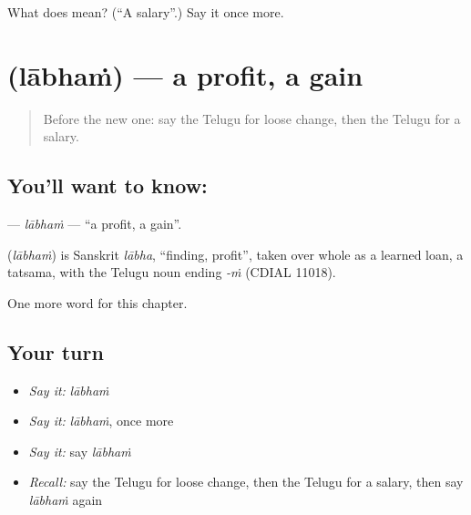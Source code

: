 \begin{tcolorbox}[breakable,colback=teal!4,colframe=teal!35!black,title={Before you move on}]
What does  mean? (\textquotedblleft{}A salary\textquotedblright{}.) Say it once more.
\end{tcolorbox}
\section[\texorpdfstring{\te{లాభం} (lābhaṁ)}{లాభం (lābhaṁ)}]{ (lābhaṁ) — a profit, a gain}

\label{lesson:TE-C235-labham}



\begin{quote}
Before the new one: say the Telugu for loose change, then the Telugu for a salary.
\end{quote}

\subsection*{You'll want to know: }
\textbf{} — \emph{lābhaṁ} — \textquotedblleft{}a profit, a gain\textquotedblright{}.

\begin{cousinweb}
\textbf{} (\emph{lābhaṁ}) is Sanskrit \emph{lābha}, \textquotedblleft{}finding, profit\textquotedblright{}, taken over whole as a learned loan, a tatsama, with the Telugu noun ending \emph{-ṁ} (CDIAL 11018).
\end{cousinweb}

\begin{grammarlens}[title={What you've built}]
One more word for this chapter.
\end{grammarlens}

\subsection*{Your turn}
\begin{itemize}
\raggedright
  \item \emph{Say it:} \emph{lābhaṁ}
  \item \emph{Say it:} \emph{lābhaṁ}, once more
  \item \emph{Say it:} say \emph{lābhaṁ}
  \item \emph{Recall:} say the Telugu for loose change, then the Telugu for a salary, then say \emph{lābhaṁ} again
\end{itemize}

